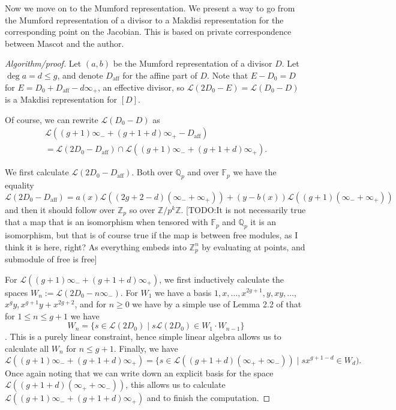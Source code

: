 \documentclass[12pt]{article}
\newcommand{\Z}{\mathbb{Z}}
\newcommand{\Q}{\mathbb{Q}}
\newcommand{\Lcal}{\mathcal{L}}
\newcommand{\F}{\mathbb{F}}
\theoremstyle{plain}
\theoremstyle{definition}
\theoremstyle{remark}
\begin{document}
Now we move on to the Mumford representation. We present a way to go from the Mumford representation of a divisor to a Makdisi representation for the corresponding point on the Jacobian. This is based on private correspondence between Mascot and the author.
\begin{proof}[Algorithm/proof]
Let $(a,b)$ be the Mumford representation of a divisor $D$. Let $\deg a = d \leq g$, and denote $D_{\text{aff}}$ for the affine part of $D$. Note that $E-D_0 = D$ for $E = D_0 + D_{\text{aff}} - d\infty_+$, an effective divisor, so $\Lcal(2D_0 - E) = \Lcal(D_0 - D)$ is a Makdisi representation for $[D]$.

Of course, we can rewrite $\Lcal(D_0 -D)$ as 
\begin{multline*}
\Lcal((g+1)\infty_- + (g+1+d)\infty_+ - D_{\text{aff}}) \\= \Lcal(2D_0 - D_{\text{aff}} ) \cap \Lcal((g+1)\infty_- + (g+1+d)\infty_+).
\end{multline*}

We first calculate $\Lcal(2D_0 - D_{\text{aff}})$. Both over $\Q_p$ and over $\F_p$ we have the equality
\[
\Lcal(2D_0 - D_{\text{aff}}) = a(x)\Lcal((2g+2-d)(\infty_- + \infty_+)) + (y-b(x))\Lcal((g+1)(\infty_- + \infty_+))
\]
and then it should follow over $\Z_p$ so over $\Z/p^k\Z$. [TODO:It is not necessarily true that a map that is an isomorphism when tensored with $\F_p$ and $\Q_p$ it is an isomorphism, but that is of course true if the map is between free modules, as I think it is here, right? As everything embeds into $\Z_p^n$ by evaluating at points, and submodule of free is free] 

For $\Lcal((g+1)\infty_- + (g+1+d)\infty_+)$, we first inductively calculate the spaces $W_n := \Lcal(2D_0 - n\infty_-)$. For $W_1$ we have a basis $1,x,\dots,x^{2g+1},y,xy,\dots$, $x^g y, x^{g+1}y+x^{2g+2}$, and for $n \geq 0$ we have by a simple use of Lemma 2.2 of \citep{makdisi04} that for $1 \leq n \leq g+1$ we have \[W_{n} = \{s \in \Lcal(2D_0) \mid s\Lcal(2D_0) \in W_1 \cdot W_{n-1}\}\]. This is a purely linear constraint, hence simple linear algebra allows us to calculate all $W_n$ for $n \leq g+1$. Finally, we have
\[
\Lcal((g+1)\infty_- + (g+1+d)\infty_+) = \{ s \in \Lcal((g+1+d)(\infty_+ + \infty_-)) \mid sx^{g+1-d} \in W_d).
\] 
Once again noting that we can write down an explicit basis for the space $\Lcal((g+1+d)(\infty_+ + \infty_-))$, this allows us to calculate $\Lcal((g+1)\infty_- + (g+1+d)\infty_+)$ and to finish the computation.
\end{proof}
\end{document}

